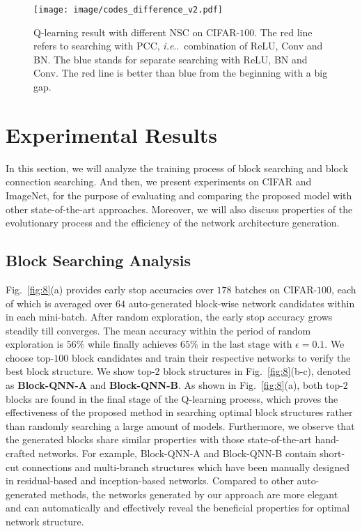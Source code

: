 \documentclass[10pt,journal,compsoc]{IEEEtran}
\makeatletter
\DeclareRobustCommand\onedot{\futurelet\@let@token\@onedot}
\def\@onedot{\ifx\@let@token.\else.\null\fi\xspace}
\def\ie{\emph{i.e}\onedot} \def\Ie{\emph{I.e}\onedot}
\makeatother
\begin{document}
\begin{figure}[tbp]
	\centering
	\texttt{[image: image/codes\_difference\_v2.pdf]}
	\caption{Q-learning result with different NSC on CIFAR-$100$. The red line refers to searching with PCC, \ie~combination of ReLU, Conv and BN. The blue stands for separate searching with ReLU, BN and Conv. The red line is better than blue from the beginning with a big gap.}\label{fig:pcc}
\end{figure}



\section{Experimental Results}

In this section, we will analyze the training process of block searching and block connection searching. And then, we present experiments on CIFAR and ImageNet, for the purpose of evaluating and comparing the proposed model with other state-of-the-art approaches. Moreover, we will also discuss properties of the evolutionary process and the efficiency of the network architecture generation.


\subsection{Block Searching Analysis}
\label{subsec:block_analysis}
Fig.~\ref{fig:8}(a) provides early stop accuracies over $178$ batches on CIFAR-$100$, each of which is averaged over $64$ auto-generated block-wise network candidates within in each mini-batch. After random exploration, the early stop accuracy grows steadily till converges. The mean accuracy within the period of random exploration is $56\%$ while finally achieves $65\%$ in the last stage with $\epsilon=0.1$.
We choose top-$100$ block candidates and train their respective networks to verify the best block structure. 
We show top-$2$ block structures in Fig.~\ref{fig:8}(b-c), denoted as \textbf{Block-QNN-A} and \textbf{Block-QNN-B}.
As shown in Fig.~\ref{fig:8}(a), both top-$2$ blocks are found in the final stage of the Q-learning process, which proves the effectiveness of the proposed method in searching optimal block structures rather than randomly searching a large amount of models.
Furthermore, we observe that the generated blocks share similar properties with those state-of-the-art hand-crafted networks. For example, Block-QNN-A and Block-QNN-B contain short-cut connections and multi-branch structures which have been manually designed in residual-based and inception-based networks. Compared to other auto-generated methods, the networks generated by our approach are more elegant and can automatically and effectively reveal the beneficial properties for optimal network structure.
\end{document}
